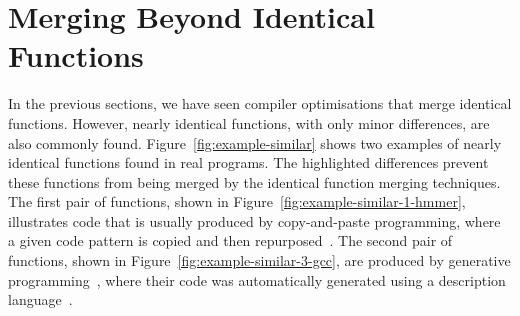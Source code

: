 
\section{Merging Beyond Identical Functions}

In the previous sections, we have seen compiler optimisations that merge identical functions.
However, nearly identical functions, with only minor differences, are also commonly found.
Figure~\ref{fig:example-similar} shows two examples of nearly identical functions found in real programs.
The highlighted differences prevent these functions from being merged by the identical function merging techniques.
The first pair of functions, shown in Figure~\ref{fig:example-similar-1-hmmer}, illustrates code that is usually produced by copy-and-paste programming,
where a given code pattern is copied and then repurposed~\cite{kim04,jablonski10,ahmed15}.
The second pair of functions, shown in Figure~\ref{fig:example-similar-3-gcc}, are produced by generative programming~\cite{czarnecki99,draheim04}, where their code was
automatically generated using a description language~\cite{ghica15}.


